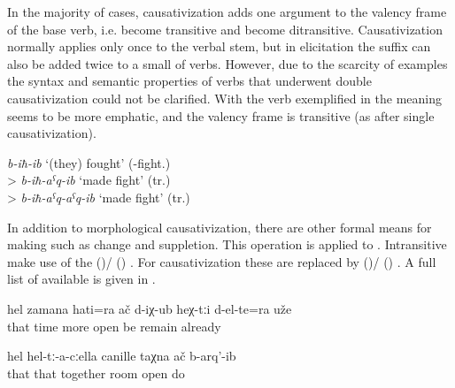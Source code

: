In the majority of cases, causativization adds one argument to the valency frame of the base verb, i.e.  become transitive and  become ditransitive.
Causativization normally applies only once to the verbal stem, but in elicitation the  suffix can also be added twice to a small  of verbs. However, due to the scarcity of examples the syntax and semantic properties of verbs that underwent double causativization could not be clarified. With the verb exemplified in  the meaning seems to be more emphatic, and the valency frame is transitive (as after single causativization). 

\begin{exe} 
	\ex	\label{ex:causativizedVerbFight} 
	\textit{b-iħ-ib} `(they) fought' (-fight.) \\
	> \textit{b-iħ-aˁq-ib} `made fight' (tr.) \\
	> \textit{b-iħ-aˁq-aˁq-ib} `made fight' (tr.)
\end{exe}


In addition to morphological causativization, there are other formal means for making  such as  change and suppletion. This operation is applied to . Intransitive  make use of the   ()\slash{} ()  . For causativization these  are replaced by  ()\slash{} ()  . A full list of available  is given in .  

%
\begin{exe}
	\ex	\label{ex:‎At that time they (the trousers) opened even more}
	\gll	hel	zamana	hati=ra	ač	d-iχ-ub	heχ-tːi	d-el-te=ra	uže\\
		that	time	more	open	be		remain	already\\
	\glt	{}

	\ex	\label{ex:‎He opened the room together with them}
	\gll	hel	hel-tː-a-cːella	canille	taχna	ač	b-arq'-ib\\
		that	that	together	room	open	do\\
	\glt	{}
\end{exe}

